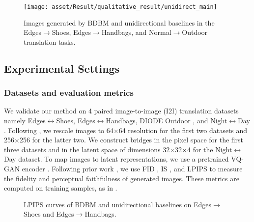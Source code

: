 \begin{figure*}
\begin{centering}
\texttt{[image: asset/Result/qualitative\_result/unidirect\_main]}
\par\end{centering}
\caption{Images generated by BDBM and unidirectional baselines in the Edges$\rightarrow$Shoes,
Edges$\rightarrow$Handbags, and Normal$\rightarrow$Outdoor translation
tasks.\label{fig:main_qualitative_results}}
\end{figure*}


\subsection{Experimental Settings}

\subsubsection{Datasets and evaluation metrics}

We validate our method on 4 paired image-to-image (I2I) translation
datasets namely Edges$\leftrightarrow$Shoes, Edges$\leftrightarrow$Handbags,
DIODE Outdoor \cite{diode_dataset}, and Night$\leftrightarrow$Day
\cite{pix2pix2017}. Following \cite{zhou2024denoising}, we rescale
images to 64$\times$64 resolution for the first two datasets and
256$\times$256 for the latter two. We construct bridges in the pixel
space for the first three datasets and in the latent space of dimensions
32$\times$32$\times$4 for the Night$\leftrightarrow$Day dataset.
To map images to latent representations, we use a pretrained VQ-GAN
encoder \cite{rombach2022high}. Following prior work \cite{LiX0L23},
we use FID \cite{heusel2017gans}, IS \cite{salimans2016improved},
and LPIPS \cite{zhang2018perceptual} to measure the fidelity and
perceptual faithfulness of generated images. These metrics are computed
on training samples, as in \cite{zhou2024denoising}.

\begin{figure}
\begin{centering}
{}
\par\end{centering}
\caption{LPIPS curves of BDBM and unidirectional baselines on Edges$\rightarrow$Shoes
and Edges$\rightarrow$Handbags.\label{fig:LPIPS-curves-main}}
\end{figure}


